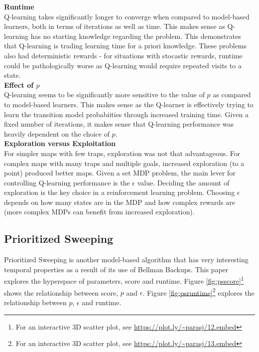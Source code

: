 \documentclass[11pt]{article}
\begin{document}
\noindent\textbf{Runtime}\\
Q-learning takes significantly longer to converge when compared to model-based learners, both in terms of iterations as well as time. This makes sense as Q-learning has no starting knowledge regarding the problem. This demonstrates that Q-learning is trading learning time for a priori knowledge. These problems also had deterministic rewards - for situations with stocastic rewards, runtime could be pathologically worse as Q-learning would require repeated visits to a state.\\


\noindent\textbf{Effect of $p$}\\
Q-learning seems to be significantly more sensitive to the value of $p$ as compared to model-based learners. This makes sense as the Q-learner is effectively trying to learn the transition model probabiities through increased training time. Given a fixed number of iterations, it makes sense that Q-learning performance was heavily dependent on the choice of $p$.\\


\noindent\textbf{Exploration versus Exploitation}\\
For simpler maps with few traps, exploration was not that advantageous. For complex maps with many traps and multiple goals, increased exploration (to a point) produced better maps. Given a set MDP problem, the main lever for controlling Q-learning performance is the $\epsilon$ value. Deciding the amount of exploration is the key choice in a reinforcement learning problem. Choosing $\epsilon$ depends on how many states are in the MDP and how complex rewards are (more complex MDPs can benefit from increased exploration).


\subsection{Prioritized Sweeping}

Prioritized Sweeping is another model-based algorithm that has very interesting temporal properties as a result of its use of Bellman Backups. This paper explores the hyperspace of parameters, score and runtime. Figure \ref{fig:psscore}\footnote{For an interactive 3D scatter plot, see \url{https://plot.ly/~parasj/12.embed}} shows the relationship between score, $p$ and $\epsilon$. Figure \ref{fig:psruntime}\footnote{For an interactive 3D scatter plot, see \url{https://plot.ly/~parasj/13.embed}} explores the relationship between $p$, $\epsilon$ and runtime.
\end{document}
